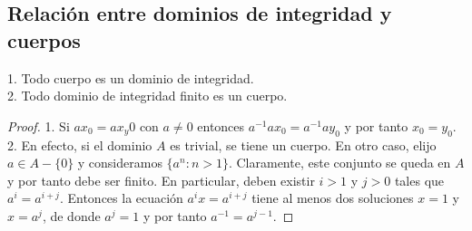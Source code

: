 \subsection{Relación entre dominios de integridad y cuerpos}

\begin{proposition}
1. Todo cuerpo es un dominio de integridad.\\
2. Todo dominio de integridad finito es un cuerpo. \\
\end{proposition}
\begin{proof}
1. Si $ax_0 = ax_y0$ con $a \neq 0$ entonces $a^{-1}ax_0 = a^{-1}ay_0$ y por tanto $x_0 = y_0$. \\
2. En efecto, si el dominio $A$ es trivial, se tiene un cuerpo. En otro caso, elijo $a \in A - \{0\}$ y consideramos $\{a^n:n > 1\}$. Claramente, este conjunto se queda en $A$ y por tanto debe ser finito. En particular, deben existir $i > 1$ y $j > 0$ tales que $a^i = a^{i+j}$. Entonces la ecuación $a^ix = a^{i+j}$ tiene al menos dos soluciones $x = 1$ y $x = a^j$, de donde $a^j = 1$ y por tanto $a^{-1} = a^{j-1}$. 
\end{proof}






